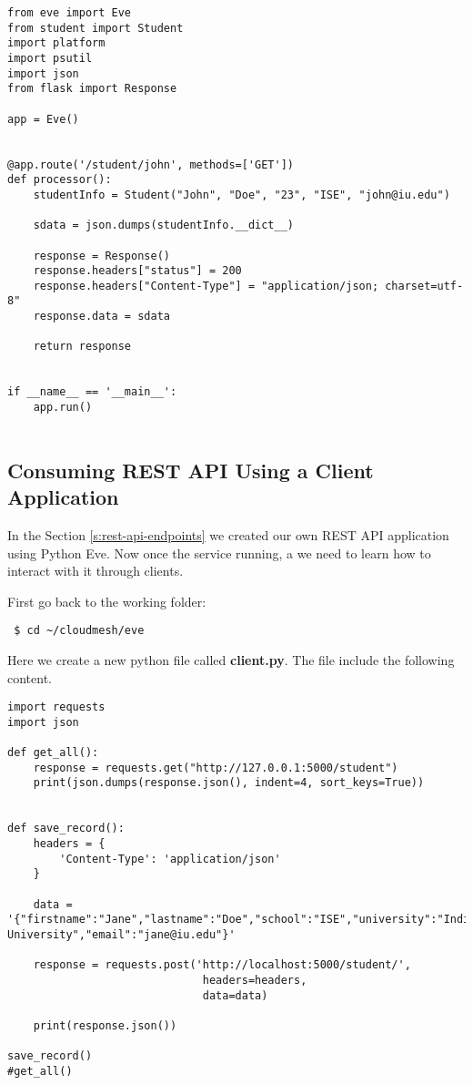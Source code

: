 \begin{lstlisting}
from eve import Eve
from student import Student
import platform
import psutil
import json
from flask import Response

app = Eve()


@app.route('/student/john', methods=['GET'])
def processor():
    studentInfo = Student("John", "Doe", "23", "ISE", "john@iu.edu")

    sdata = json.dumps(studentInfo.__dict__)

    response = Response()
    response.headers["status"] = 200
    response.headers["Content-Type"] = "application/json; charset=utf-8"
    response.data = sdata

    return response


if __name__ == '__main__':
    app.run()


\end{lstlisting}


\subsection{Consuming REST API Using a Client Application}

In the Section \ref{s:rest-api-endpoints} we created our own REST API application
using Python Eve. Now once the service running, a we need to learn how to
interact with it through clients.

First go back to the working folder:

\begin{lstlisting}
 $ cd ~/cloudmesh/eve
\end{lstlisting}

Here we create a new python file called \textbf{client.py}. The file include the
following content.

\begin{lstlisting}
import requests
import json

def get_all():
    response = requests.get("http://127.0.0.1:5000/student")
    print(json.dumps(response.json(), indent=4, sort_keys=True))


def save_record():
    headers = {
        'Content-Type': 'application/json'
    }

    data = '{"firstname":"Jane","lastname":"Doe","school":"ISE","university":"Indiana University","email":"jane@iu.edu"}'

    response = requests.post('http://localhost:5000/student/',
                              headers=headers,
                              data=data)

    print(response.json())

save_record()
#get_all()
\end{lstlisting}

